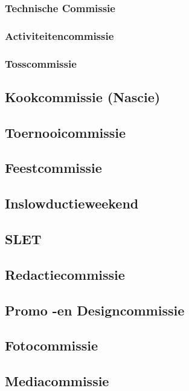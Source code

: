 \documentclass[]{article}
\begin{document}
\subsubsection{Technische Commissie}

\subsubsection{Activiteitencommissie}

\subsubsection{Tosscommissie}

\subsection{Kookcommissie (Nascie)}

\subsection{Toernooicommissie}

\subsection{Feestcommissie}

\subsection{Inslowductieweekend}

\subsection{SLET}

\subsection{Redactiecommissie}

\subsection{Promo -en Designcommissie}

\subsection{Fotocommissie}

\subsection{Mediacommissie}
\end{document}
